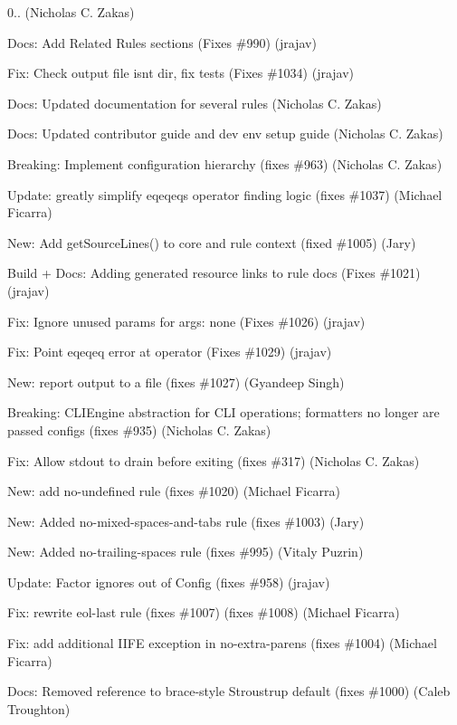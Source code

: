 \begin{DoxyItemize}
\item 0.. (Nicholas C. Zakas)
\item Docs\+: Add Related Rules sections (Fixes \#990) (jrajav)
\item Fix\+: Check output file isn\textquotesingle{}t dir, fix tests (Fixes \#1034) (jrajav)
\item Docs\+: Updated documentation for several rules (Nicholas C. Zakas)
\item Docs\+: Updated contributor guide and dev env setup guide (Nicholas C. Zakas)
\item Breaking\+: Implement configuration hierarchy (fixes \#963) (Nicholas C. Zakas)
\item Update\+: greatly simplify eqeqeq\textquotesingle{}s operator finding logic (fixes \#1037) (Michael Ficarra)
\item New\+: Add get\+Source\+Lines() to core and rule context (fixed \#1005) (Jary)
\item Build + Docs\+: Adding generated resource links to rule docs (Fixes \#1021) (jrajav)
\item Fix\+: Ignore unused params for args\+: \textquotesingle{}none\textquotesingle{} (Fixes \#1026) (jrajav)
\item Fix\+: Point eqeqeq error at operator (Fixes \#1029) (jrajav)
\item New\+: report output to a file (fixes \#1027) (Gyandeep Singh)
\item Breaking\+: C\+L\+I\+Engine abstraction for C\+LI operations; formatters no longer are passed configs (fixes \#935) (Nicholas C. Zakas)
\item Fix\+: Allow stdout to drain before exiting (fixes \#317) (Nicholas C. Zakas)
\item New\+: add no-\/undefined rule (fixes \#1020) (Michael Ficarra)
\item New\+: Added no-\/mixed-\/spaces-\/and-\/tabs rule (fixes \#1003) (Jary)
\item New\+: Added no-\/trailing-\/spaces rule (fixes \#995) (Vitaly Puzrin)
\item Update\+: Factor ignores out of Config (fixes \#958) (jrajav)
\item Fix\+: rewrite eol-\/last rule (fixes \#1007) (fixes \#1008) (Michael Ficarra)
\item Fix\+: add additional I\+I\+FE exception in no-\/extra-\/parens (fixes \#1004) (Michael Ficarra)
\item Docs\+: Removed reference to brace-\/style Stroustrup default (fixes \#1000) (Caleb Troughton)

\end{DoxyItemize}

